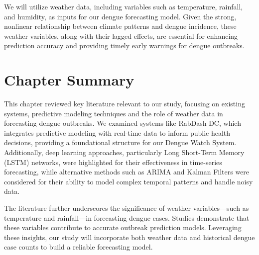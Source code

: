 We will utilize weather data, including variables such as temperature, rainfall, and humidity, as inputs for our dengue forecasting model. Given the strong, nonlinear relationship between climate patterns and dengue incidence, these weather variables, along with their lagged effects, are essential for enhancing prediction accuracy and providing timely early warnings for dengue outbreaks.


\section{Chapter Summary}
This chapter reviewed key literature relevant to our study, focusing on existing systems, predictive modeling techniques and the role of weather data in forecasting dengue outbreaks. We examined systems like RabDash DC, which integrates predictive modeling with real-time data to inform public health decisions, providing a foundational structure for our Dengue Watch System. Additionally, deep learning approaches, particularly Long Short-Term Memory (LSTM) networks, were highlighted for their effectiveness in time-series forecasting, while alternative methods such as ARIMA and Kalman Filters were considered for their ability to model complex temporal patterns and handle noisy data.

The literature further underscores the significance of weather variables—such as temperature and rainfall—in forecasting dengue cases. Studies demonstrate that these variables contribute to accurate outbreak prediction models. Leveraging these insights, our study will incorporate both weather data and historical dengue case counts to build a reliable forecasting model.
















